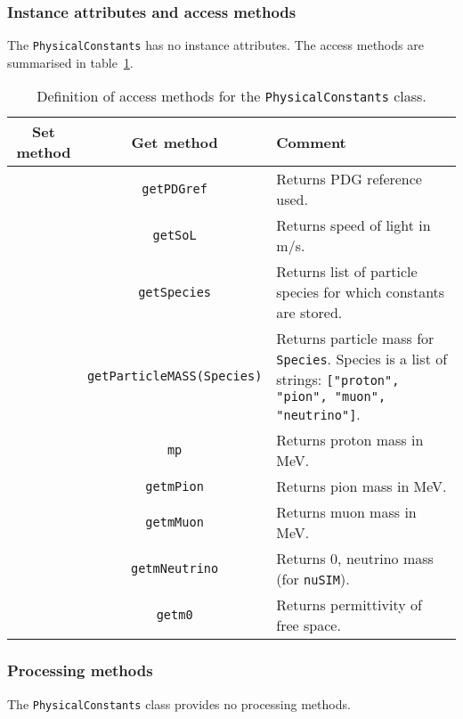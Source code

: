 \subsubsection{Instance attributes and access methods}
\label{Para:PhysCnsts:InstAttr}
\noindent
The \texttt{PhysicalConstants} has no instance attributes.
The access methods are summarised in
table~\ref{Tab:PhysCnsts:AccessMethods}.
\begin{table}[h]
  \caption{
    Definition of access methods for the \texttt{PhysicalConstants}
    class. 
  }
  \label{Tab:PhysCnsts:AccessMethods}
  \begin{center}
    \begin{tabular}{|c|c|p{7cm}|}
      \hline
      \textbf{Set method} & \textbf{Get method}  & \textbf{Comment}                                                                                       \\
      \hline
        & \texttt{getPDGref}   & Returns PDG reference used.                               \\
        & \texttt{getSoL} & Returns speed of light in m/s.                  \\
        & \texttt{getSpecies}      & Returns list of particle species for which constants are stored. \\
        & \texttt{getParticleMASS(Species)}  & Returns particle mass for \texttt{Species}.
                                               Species is a list of strings:
                                               \texttt{["proton", "pion", "muon", "neutrino"]}. \\
        & \texttt{mp}                        & Returns proton mass in MeV. \\
        & \texttt{getmPion}                  & Returns pion mass in MeV. \\
        & \texttt{getmMuon}                  & Returns muon mass in MeV. \\
        & \texttt{getmNeutrino}              & Returns 0, neutrino mass (for \texttt{nuSIM}). \\
        & \texttt{getm0}                     & Returns permittivity of free space.                   \\
      \hline
    \end{tabular}
  \end{center}
\end{table}

\subsubsection{Processing methods}
\noindent
The \texttt{PhysicalConstants} class provides no processing methods.

